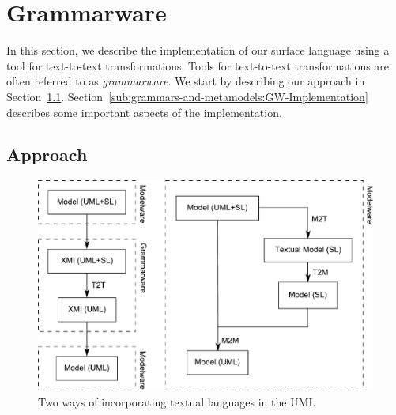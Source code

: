 \section{Grammarware}
\label{sec:grammars-and-metamodels:Grammarware}

In this section, we describe the implementation of our surface language using a tool for text-to-text transformations.
Tools for text-to-text transformations are often referred to as \emph{grammarware}.
We start by describing our approach in Section~\ref{sub:grammars-and-metamodels:GW-Approach}.
Section~\ref{sub:grammars-and-metamodels:GW-Implementation} describes some important aspects of the implementation.

\subsection{Approach}
\label{sub:grammars-and-metamodels:GW-Approach}

\begin{figure}
\centering
\includegraphics[scale=0.5]{grammars-and-metamodels/figs/approach-comparison}
\caption{Two ways of incorporating textual languages in the UML}
\label{fig:grammars-and-metamodels:approaches}
\end{figure}

